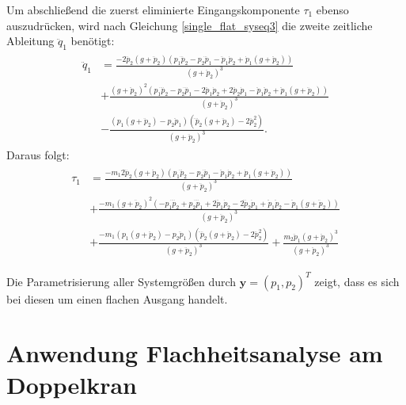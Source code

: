 Um abschließend die zuerst eliminierte Eingangskomponente $\tau_1$ ebenso auszudrücken, wird nach Gleichung \eqref{single_flat_syseq3} die zweite zeitliche Ableitung $\ddot{q}_1$ benötigt:
\begin{align}
	\begin{split}
	\ddot{q}_1 &=
	\frac{-2 \dddot{p}_{2} \left(g + \ddot{p}_{2}\right) \left(p_{1} \dddot{p}_{2} - p_{2} \dddot{p}_{1} - \ddot{p}_{1} \dot{p}_{2} + \dot{p}_{1} \left(g + \ddot{p}_{2}\right)\right) }{\left(g + \ddot{p}_{2}\right)^{3}} \\	
	&+ \frac{\left(g + \ddot{p}_{2}\right)^{2} \left(p_{1} \ddddot{p}_{2} - p_{2} \ddddot{p}_{1} - 2 \dddot{p}_{1} \dot{p}_{2} + 2 \dddot{p}_{2} \dot{p}_{1} - \ddot{p}_{1} \ddot{p}_{2} + \ddot{p}_{1} \left(g + \ddot{p}_{2}\right)\right)}{\left(g + \ddot{p}_{2}\right)^{3}}\\	
	&- \frac{\left(p_{1} \left(g + \ddot{p}_{2}\right) - p_{2} \ddot{p}_{1}\right) \left(\ddddot{p}_{2} \left(g + \ddot{p}_{2}\right) - 2 \dddot{p}_{2}^{2}\right)}{\left(g + \ddot{p}_{2}\right)^{3}}.
	\end{split}
\end{align}
Daraus folgt:
\begin{align}
	\begin{split}
	\tau_1 &=
	\frac{- m_{1} 2 \dddot{p}_{2} \left(g + \ddot{p}_{2}\right) \left(p_{1} \dddot{p}_{2} - p_{2} \dddot{p}_{1} - \ddot{p}_{1} \dot{p}_{2} + \dot{p}_{1} \left(g + \ddot{p}_{2}\right)\right)}{\left(g + \ddot{p}_{2}\right)^{3}} \\	
	&+ \frac{- m_{1} \left(g + \ddot{p}_{2}\right)^{2} \left(- p_{1} \ddddot{p}_{2} + p_{2} \ddddot{p}_{1} + 2 \dddot{p}_{1} \dot{p}_{2} - 2 \dddot{p}_{2} \dot{p}_{1} + \ddot{p}_{1} \ddot{p}_{2} - \ddot{p}_{1} \left(g + \ddot{p}_{2}\right)\right)}{\left(g + \ddot{p}_{2}\right)^{3}} \\
	&+ \frac{-m_1 \left(p_{1} \left(g + \ddot{p}_{2}\right) - p_{2} \ddot{p}_{1}\right) \left(\ddddot{p}_{2} \left(g + \ddot{p}_{2}\right) - 2 \dddot{p}_{2}^{2}\right)}{\left(g + \ddot{p}_{2}\right)^{3}} + \frac{m_{2} \ddot{p}_{1} \left(g + \ddot{p}_{2}\right)^{3}}{\left(g + \ddot{p}_{2}\right)^{3}}
	\end{split}
\end{align}

Die Parametrisierung aller Systemgrößen durch $\mathbf{y} = (p_1, p_2)^T$ zeigt, dass es sich bei diesen um einen flachen Ausgang handelt.

\section{Anwendung Flachheitsanalyse am Doppelkran}
\label{sec:flatness_analysis_double_crane}


